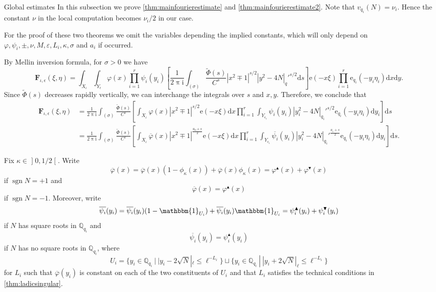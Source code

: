 \documentclass[10pt,oneside,reqno]{amsart}
\makeatletter
\newcommand\lopen{\mathopen{]}}
\newcommand\ropen{\mathclose{[}}
\newcommand\rmd{\mathrm{d}}
\newcommand\rme{\mathrm{e}}
\newcommand\rmi{\mathrm{i}}
\newcommand\bF{\mathbf{F}}
\newcommand\QQ{\mathbb{Q}}
\newcommand\triv{\mathbbm{1}}
\newcommand\dpii{2\uppi\rmi}
\DeclareMathOperator\sgn{sgn}
\renewcommand\leq{\leqslant}
\def\subsection{\@startsection{subsection}{2}
  \z@{3pt\@plus0pt}{-.5em}%
  {\normalfont\bfseries}}
\theoremstyle{THEOREM}
\theoremstyle{DEFINITION}
\theoremstyle{EXERCISE}
\numberwithin{equation}{section}
\renewenvironment{proof}[1][\proofname]{\par
  \vspace{-6pt}
  \pushQED{\qed}
  \normalfont \topsep6\p@\@plus6\p@\relax
  \trivlist
  \item[\hskip\labelsep\rmfamily\bfseries
    #1\@addpunct{:}]\ignorespaces
}{
  \popQED\endtrivlist\@endpefalse
  \vspace{-6pt}
}
\makeatother
\begin{document}
\subsection{Global estimates}
In this subsection we prove \autoref{thm:mainfourierestimate} and \autoref{thm:mainfourierestimate2}. Note that $v_{q_i}(N)=\nu_i$. Hence the constant $\nu$ in the local computation becomes $\nu_i/2$ in our case. 

For the proof of these two theorems we omit the variables depending the implied constants, which will only depend on $\varphi,\psi_i,\pm,\nu,M,\varepsilon,L_i,\kappa,\sigma$ and $a_i$ if occurred.

\smallskip

\begin{proof}[Proof of \autoref{thm:mainfourierestimate}]
By Mellin inversion formula, for $\sigma>0$ we have
\[
\bF_{\iota,\epsilon}(\xi,\eta)=\int_{X_\iota}\int_{Y_\epsilon}\varphi(x)\prod_{i=1}^{r}\psi_i(y_i)\left[\frac{1}{\dpii}\int_{(\sigma)}\frac{\widetilde{\Phi}(s)}{C^s}|x^2\mp 1|^{s/2}|y^2-4N|_q'^{s/2}\rmd s\right]\rme(-x\xi)\prod_{i=1}^{r}\rme_{q_i}(-y_i\eta_i)\rmd x\rmd y.
\]
Since $\widetilde{\Phi}(s)$ decreases rapidly vertically, we can interchange the integrals over $s$ and $x,y$. Therefore, we conclude that
\begin{align*}
\bF_{\iota,\epsilon}(\xi,\eta)&=\frac{1}{\dpii}\int_{(\sigma)}\frac{\widetilde{\Phi}(s)}{C^s}\left[ \int_{X_\iota}\varphi(x)|x^2\mp 1|^{s/2}\rme(-x\xi)\rmd x\prod_{i=1}^{r}\int_{Y_{\epsilon_i}}\psi_i(y_i)|y_i^2-4N|_{q_i}'^{s/2}\rme_{q_i}(-y_i\eta_i)\rmd y_i\right]\rmd s\\
&=\frac{1}{\dpii}\int_{(\sigma)}\frac{\widetilde{\Phi}(s)}{C^s}\left[ \int_{X_\iota}\overline{\varphi}(x)|x^2\mp 1|^{\frac{a_0+s}{2}}\rme(-x\xi)\rmd x\prod_{i=1}^{r}\int_{Y_{\epsilon_i}}\overline{\psi_i}(y_i)|y_i^2-4N|_{q_i}'^{\frac{a_i+s}{2}}\rme_{q_i}(-y_i\eta_i)\rmd y_i\right]\rmd s.
\end{align*}

Fix $\kappa\in \lopen 0,1/2\ropen$. Write 
\[
\overline{\varphi}(x)=\overline{\varphi}(x)(1-\phi_\kappa(x))+\overline{\varphi}(x)\phi_\kappa(x) =\varphi^\blacktriangle(x)+\varphi^\blacktriangledown(x)
\]
if $\sgn N=+1$ and
\[
\overline{\varphi}(x)=\varphi^\blacktriangle(x)
\]
if $\sgn N=-1$. Moreover, write
\[
\overline{\psi_i}(y_i)=\overline{\psi_i}(y_i)(1-\triv_{U_i})+\overline{\psi_i}(y_i)\triv_{U_i} =\psi_i^\blacktriangle(y_i)+\psi_i^\blacktriangledown(y_i)
\]
if $N$ has square roots in $\QQ_{q_i}$ and
\[
\overline{\psi_i}(y_i)=\psi_i^\blacktriangle(y_i)
\]
if $N$ has no square roots in $\QQ_{q_i}$, where
\[
U_i=\{y_i\in \QQ_{q_i}\ |\ |y_i-2\sqrt{N}|_\ell\leq \ell^{-L_i}\}\sqcup \{y_i\in \QQ_{q_i}\ |\ |y_i+2\sqrt{N}|_\ell\leq \ell^{-L_i}\}
\]
for $L_i$ such that $\overline{\varphi}(y_i)$ is constant on each of the two constituents of $U_i$ and that $L_i$ satisfies the technical conditions in \autoref{thm:ladicsingular}.


\end{proof}
\end{document}
